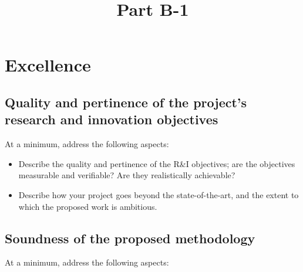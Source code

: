 \documentclass[11pt,draftproposal]{msca-pf}
\title{Part B-1}
\author{}
\date{}
\begin{document}
\maketitle

\section{Excellence}

\subsection{Quality and pertinence of the project's research and innovation objectives}

At a minimum, address the following aspects:

\begin{itemize}
    \item Describe the quality and pertinence of the R\&I objectives; are the
    objectives measurable and verifiable? Are they realistically achievable?

    \item Describe how your project goes beyond the state-of-the-art, and the
    extent to which the proposed work is ambitious.
\end{itemize}

\subsection{Soundness of the proposed methodology}

At a minimum, address the following aspects:
\end{document}
